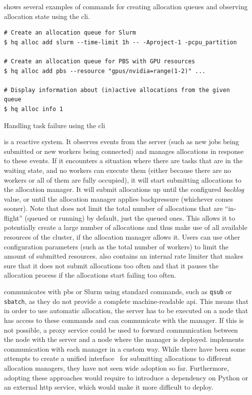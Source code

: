  shows several examples of commands for creating allocation queues and
observing allocation state using the \hyperqueue{} \gls{cli}.

\begin{listing}[h]
	\begin{verbatim}
# Create an allocation queue for Slurm
$ hq alloc add slurm --time-limit 1h -- -Aproject-1 -pcpu_partition

# Create an allocation queue for PBS with GPU resources
$ hq alloc add pbs --resource "gpus/nvidia=range(1-2)" ...

# Display information about (in)active allocations from the given queue
$ hq alloc info 1
	\end{verbatim}
	\caption{Handling task failure using the \hyperqueue{} \acrshort{cli}}
	\label{lst:hq-cli-autoalloc}
\end{listing}

\Autoalloc{} is a reactive system. It observes events from the server (such as new jobs
being submitted or new workers being connected) and manages allocations in response to these
events. If it encounters a situation where there are tasks that are in the waiting state, and no
workers can execute them (either because there are no workers or all of them are fully occupied),
it will start submitting allocations to the allocation manager. It will submit allocations up until
the configured \emph{backlog} value, or until the allocation manager applies backpressure
(whichever comes sooner). Note that \autoalloc{} does not limit the total number of
allocations that are ``in-flight'' (queued or running) by default, just the queued ones. This
allows it to potentially create a large number of allocations and thus make use of all available
resources of the cluster, if the allocation manager allows it. Users can use other configuration
parameters (such as the total number of workers) to limit the amount of submitted resources.
\Autoalloc{} also contains an internal rate limiter that makes sure that it does not
submit allocations too often and that it pauses the allocation process if the allocations start
failing too often.

\hyperqueue{} communicates with \gls{pbs} or Slurm using standard
commands, such as \texttt{qsub} or \texttt{sbatch}, as they do not provide a
complete machine-readable \gls{api}. This means that in order to use automatic
allocation, the server has to be executed on a node that has access to these commands and can
communicate with the manager. If this is not possible, a proxy service could be used to forward
communication between the node with the server and a node where the manager is deployed.
\hyperqueue{} implements communication with each manager in a custom way. While there
have been some attempts to create a unified interface~\cite{psij,workflow-alloc-manager-comm} for submitting
allocations to different allocation managers, they have not seen wide adoption so far. Furthermore,
adopting these approaches would require \hq{} to introduce a dependency on Python
or an external \gls{http} service, which would make it more difficult to deploy.


